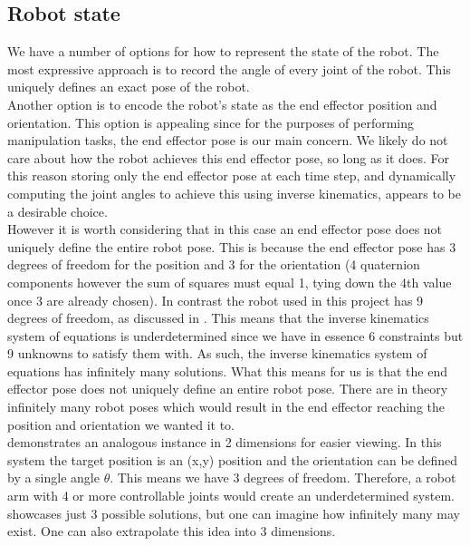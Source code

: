 \subsection{Robot state}
We have a number of options for how to represent the state of the robot. The most expressive approach is to record the angle of every joint of the robot. This uniquely defines an exact pose of the robot.
\\
Another option is to encode the robot's state as the end effector position and orientation. This option is appealing since for the purposes of performing manipulation tasks, the end effector pose is our main concern. We likely do not care about how the robot achieves this end effector pose, so long as it does. For this reason storing only the end effector pose at each time step, and dynamically computing the joint angles to achieve this using inverse kinematics, appears to be a desirable choice.\\

However it is worth considering that in this case an end effector pose does not uniquely define the entire robot pose. This is because the end effector pose has 3 degrees of freedom for the position and 3 for the orientation (4 quaternion components however the sum of squares must equal 1, tying down the 4th value once 3 are already chosen). In contrast the robot used in this project has 9 degrees of freedom, as discussed in . This means that the inverse kinematics system of equations is underdetermined since we have in essence 6 constraints but 9 unknowns to satisfy them with. As such, the inverse kinematics system of equations has infinitely many solutions. What this means for us is that the end effector pose does not uniquely define an entire robot pose. There are in theory infinitely many robot poses which would result in the end effector reaching the position and orientation we wanted it to.\\

 demonstrates an analogous instance in 2 dimensions for easier viewing. In this system the target position is an (x,y) position and the orientation can be defined by a single angle $\theta$. This means we have 3 degrees of freedom. Therefore, a robot arm with 4 or more controllable joints would create an underdetermined system.  showcases just 3 possible solutions, but one can imagine how infinitely many may exist. One can also extrapolate this idea into 3 dimensions.


